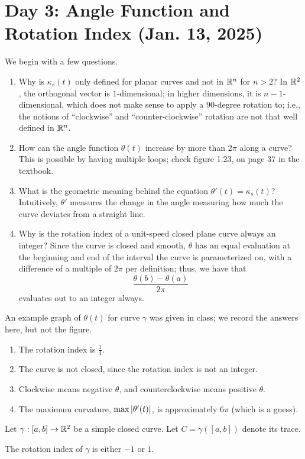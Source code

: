 \section{Day 3: Angle Function and Rotation Index (Jan. 13, 2025)}
We begin with a few questions.
\begin{enumerate}[label=(\alph*)]
    \item Why is $\kappa_s(t)$ only defined for planar curves and not in $\mathbb R^n$ for $n > 2$? In $\mathbb R^2$, the orthogonal vector is $1$-dimensional; in higher dimensions, it is $n-1$-dimensional, which does not make sense to apply a $90$-degree rotation to; i.e., the notions of ``clockwise'' and ``counter-clockwise'' rotation are not that well defined in $\mathbb R^n$.
    \item How can the angle function $\theta(t)$ increase by more than $2\pi$ along a curve? This is possible by having multiple loops; check figure 1.23, on page 37 in the textbook.
    \item What is the geometric meaning behind the equation $\theta'(t)= \kappa_s(t)$? Intuitively, $\theta'$ measures the change in the angle measuring how much the curve deviates from a straight line.
    \item Why is the rotation index of a unit-speed closed plane curve always an integer? Since the curve is closed and smooth, $\theta$ has an equal evaluation at the beginning and end of the interval the curve is parameterized on, with a difference of a multiple of $2\pi$ per definition; thus, we have that
    \[ \frac{\theta(b) - \theta(a)}{2 \pi} \]
    evaluates out to an integer always.
\end{enumerate}
An example graph of $\theta(t)$ for curve $\gamma$ was given in class; we record the answers here, but not the figure.
\begin{enumerate}[label=(\alph*)]
    \item The rotation index is $\frac{1}{4}$.
    \item The curve is not closed, since the rotation index is not an integer.
    \item Clockwise means negative $\theta$, and counterclockwise means positive $\theta$.
    \item The maximum curvature, $\max \left\lvert \theta'(t) \right\rvert$, is approximately $6 \pi$ (which is a guess).
\end{enumerate}
Let $\gamma : [a, b] \to \mathbb R^2$ be a simple closed curve. Let $C = \gamma([a, b])$ denote its trace.
\begin{simplethm}
    The rotation index of $\gamma$ is either $-1$ or $1$.
\end{simplethm}
